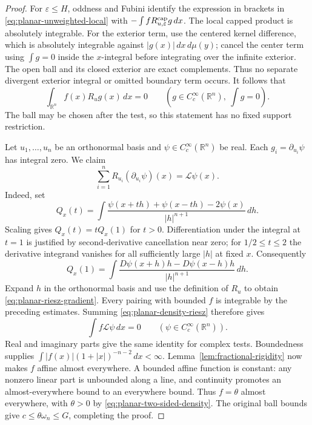 \begin{proof}
For $\varepsilon\le H$, oddness and Fubini identify the expression in
brackets in \eqref{eq:planar-unweighted-local} with
$-\int f R_{u,\varepsilon}^{\rm cap}g\,dx$.
The local capped product is absolutely integrable.  For the exterior
term, use the centered kernel difference, which is absolutely integrable
against $|g(x)|\,dx\,d\mu(y)$; cancel the center term using $\int g=0$
inside the $x$-integral before integrating over the infinite exterior.
The open ball and its closed exterior are exact complements.  Thus no
separate divergent exterior integral or omitted boundary term occurs.
It follows that
\begin{equation}\label{eq:planar-density-riesz}
 \int_{\mathbb R^n}f(x)R_ug(x)\,dx=0
 \qquad\left(g\in C_c^\infty(\mathbb R^n),\ \int g=0\right).
\end{equation}
The ball may be chosen after the test, so this statement has no fixed
support restriction.

Let $u_1,\ldots,u_n$ be an orthonormal basis and
$\psi\in C_c^\infty(\mathbb R^n)$ be real.  Each
$g_i=\partial_{u_i}\psi$ has integral zero.  We claim
\begin{equation}\label{eq:planar-riesz-gradient}
 \sum_{i=1}^nR_{u_i}(\partial_{u_i}\psi)(x)=\mathcal L\psi(x).
\end{equation}
Indeed, set
\[
 Q_x(t)=\int\frac{\psi(x+th)+\psi(x-th)-2\psi(x)}{|h|^{n+1}}\,dh.
\]
Scaling gives $Q_x(t)=tQ_x(1)$ for $t>0$.  Differentiation under the
integral at $t=1$ is justified by second-derivative cancellation near
zero; for $1/2\le t\le2$ the derivative integrand vanishes for all
sufficiently large $|h|$ at fixed $x$.  Consequently
\[
 Q_x(1)=\int\frac{D\psi(x+h)h-D\psi(x-h)h}{|h|^{n+1}}\,dh.
\]
Expand $h$ in the orthonormal basis and use the definition of $R_u$ to
obtain \eqref{eq:planar-riesz-gradient}.  Every pairing with bounded $f$
is integrable by the preceding estimates.  Summing
\eqref{eq:planar-density-riesz} therefore gives
\[
 \int f\mathcal L\psi\,dx=0\qquad(\psi\in C_c^\infty(\mathbb R^n)).
\]
Real and imaginary parts give the same identity for complex tests.
Boundedness supplies $\int|f(x)|(1+|x|)^{-n-2}\,dx<\infty$.
Lemma~\ref{lem:fractional-rigidity} now makes $f$ affine almost everywhere.
A bounded affine function is constant: any nonzero linear part is
unbounded along a line, and continuity promotes an almost-everywhere
bound to an everywhere bound.  Thus $f=\theta$ almost everywhere, with
$\theta>0$ by \eqref{eq:planar-two-sided-density}.  The original ball
bounds give $c\le\theta\omega_n\le G$, completing the proof.
\end{proof}

